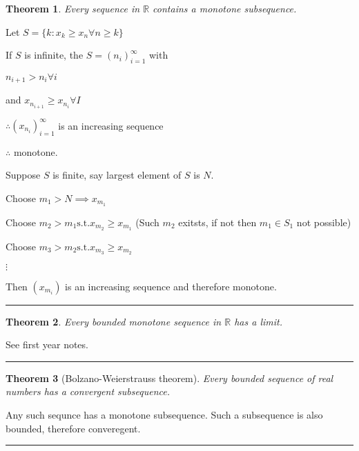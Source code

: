 \documentclass[twoside]{article}
\newcounter{lecnum}
\newtheorem{theorem}{Theorem}[lecnum]
\newenvironment{proof}{{\bf Proof:}}{\hfill\rule{2mm}{2mm}}
\newcommand\R{\mathbb{R}}
\begin{document}
\begin{theorem}
    Every sequence in $\R$ contains a monotone subsequence. 
\end{theorem}

\begin{proof}
    Let $S = \{k : x_k \geq x_n \forall n \geq k\}$
    
    If $S$ is infinite, the $S = (n_i)_{i=1}^\infty$ with 

    $n_{i+1} > n_i \forall i$

    and $x_{n_{i+1}} \geq x_{n_i} \forall I$

    $\therefore (x_{n_i})_{i=1}^\infty $ is an increasing sequence

    $\therefore $ monotone. 

    Suppose $S$ is finite, say largest element of $S$ is $N$.

    Choose $m_1 > N \implies x_{m_1}$

    Choose $m_2 > m_1 \text{s.t.} x_{m_2} \geq x_{m_1}$ (Such $m_2$ exitsts, if not then $m_1 \in S_1$ not possible)

    Choose $m_3 > m_2 \text{s.t.} x_{m_3} \geq x_{m_2}$

    $\vdots$

    Then $(x_{m_i})$ is an increasing sequence and therefore monotone. 
\end{proof}

\begin{theorem}
    Every bounded monotone sequence in $\R$ has a limit. 
\end{theorem}

\begin{proof}
    See first year notes. 
\end{proof}

\begin{theorem}[Bolzano-Weierstrauss theorem]

    Every bounded sequence of real numbers has a convergent subsequence.
    
\end{theorem}

\begin{proof}
    Any such sequnce has a monotone subsequence. Such a subsequence is also bounded, therefore converegent. 
\end{proof}
\end{document}

